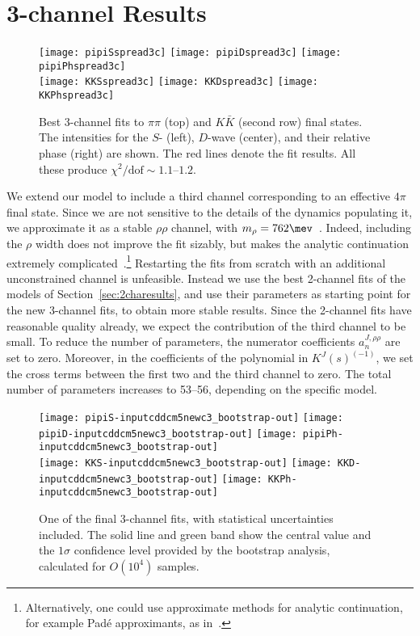 \section{3-channel Results}
\label{sec:3charesults}
\begin{figure}
\centering
\texttt{[image: pipiSspread3c]} \texttt{[image: pipiDspread3c]} \texttt{[image: pipiPhspread3c]} \\
\texttt{[image: KKSspread3c]} \texttt{[image: KKDspread3c]} \texttt{[image: KKPhspread3c]} 
\caption{\label{fig:3channelfits} Best 3-channel fits to $\pi \pi$ (top) and $K \bar K$ (second row) final states. The intensities for the $S$- (left), $D$-wave (center), and their relative phase (right) are shown. The red lines denote the fit results. All these produce $\chi^2/\text{dof}\sim 1.1$--$1.2$.
 }
\end{figure}
We extend our model to include a third channel corresponding to an effective $4\pi$ final state. Since we are not sensitive to the details of the dynamics populating it, we approximate it as a stable $\rho\rho$ channel, with $m_\rho = 762\mev$~\cite{GarciaMartin:2011nna}.  Indeed, including the $\rho$ width does not improve the fit sizably, but makes the analytic continuation extremely complicated~\cite{JPAC:2018zwp}.\footnote{Alternatively, one could use approximate methods for analytic continuation, for example Pad\'e approximants, as in~\cite{Ropertz:2018stk}.} 
Restarting the fits from scratch with an additional unconstrained channel is unfeasible.
Instead we use the best 2-channel fits of the models of Section~\ref{sec:2charesults}, and use their parameters as starting point for the new 3-channel fits, to obtain more stable results. Since the 2-channel fits have reasonable quality already, we expect the contribution of the third channel to be small. To reduce the number of parameters, the numerator coefficients $a^{J,\rho\rho}_n$ are set to zero. Moreover, in the coefficients of the polynomial in $K^J(s)^{(-1)}$, 
we set the cross terms between the first two and the third channel to zero. The total number of parameters increases to 53--56, depending on the specific model.



\begin{figure}
\centering
\texttt{[image: pipiS-inputcddcm5newc3\_bootstrap-out]} \texttt{[image: pipiD-inputcddcm5newc3\_bootstrap-out]} \texttt{[image: pipiPh-inputcddcm5newc3\_bootstrap-out]} \\
\texttt{[image: KKS-inputcddcm5newc3\_bootstrap-out]} \texttt{[image: KKD-inputcddcm5newc3\_bootstrap-out]} \texttt{[image: KKPh-inputcddcm5newc3\_bootstrap-out]}
\caption{One of the final 3-channel fits, with statistical uncertainties included. The solid line and green band show the central value and the $1\sigma$ confidence level provided by the bootstrap analysis, calculated for $O(10^4)$ samples. }
\label{fig:bootstrapbestfit}
\end{figure}


